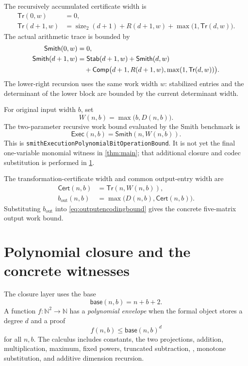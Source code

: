 \documentclass[11pt]{article}
\theoremstyle{definition}
\newcommand{\N}{\mathbb{N}}
\newcommand{\natsize}{\operatorname{size}_2}
\newcommand{\code}[1]{\texttt{\detokenize{#1}}}
\newcommand{\decl}[1]{\nolinkurl{#1}}
\begin{document}
The recursively accumulated certificate width is
\begin{align}
 \mathsf{Tr}(0,w)&=0,\label{eq:transformrec0}\\
 \mathsf{Tr}(d+1,w)&=\natsize(d+1)+R(d+1,w)
       +\max\bigl(1,\mathsf{Tr}(d,w)\bigr).
 \label{eq:transformrec}
\end{align}
The actual arithmetic trace is bounded by
\begin{align}
 \mathsf{Smith}(0,w)&=0,\label{eq:smithrec0}\\
 \mathsf{Smith}(d+1,w)&=
  \mathsf{Stab}(d+1,w)+\mathsf{Smith}(d,w)\notag\\
 &\quad+\mathsf{Comp}\bigl(d+1,R(d+1,w),
                    \max(1,\mathsf{Tr}(d,w))\bigr).
 \label{eq:smithrec}
\end{align}
The lower-right recursion uses the same work width $w$: stabilized entries and the determinant of the lower block are bounded by the current determinant width.

For original input width $b$, set
\begin{equation}
 W(n,b)=\max\bigl(b,D(n,b)\bigr).
 \label{eq:workwidth}
\end{equation}
The two-parameter recursive work bound evaluated by the Smith benchmark is
\begin{equation}
 \mathsf{Exec}(n,b)=\mathsf{Smith}(n,W(n,b)).
 \label{eq:closedexec}
\end{equation}
This is \decl{smithExecutionPolynomialBitOperationBound}.  It is not yet the final one-variable monomial witness in \cref{thm:main}; that additional closure and codec substitution is performed in \cref{sec:poly}.

The transformation-certificate width and common output-entry width are
\begin{align}
 \mathsf{Cert}(n,b)&=\mathsf{Tr}(n,W(n,b)),\label{eq:certbound}\\
 b_{\mathrm{out}}(n,b)&=\max\bigl(D(n,b),\mathsf{Cert}(n,b)\bigr).
 \label{eq:outputentry}
\end{align}
Substituting $b_{\mathrm{out}}$ into \eqref{eq:outputencodingbound} gives the concrete five-matrix output work bound.

\section{Polynomial closure and the concrete witnesses}
\label{sec:poly}

The closure layer uses the base
\[
  \mathsf{base}(n,b)=n+b+2.
\]
A function $f:\N^2\to\N$ has a \emph{polynomial envelope} when the formal object stores a degree $d$ and a proof
\[
  f(n,b)\le\mathsf{base}(n,b)^d
\]
for all $n,b$.  The calculus includes constants, the two projections, addition, multiplication, maximum, fixed powers, truncated subtraction, \code{Nat.size}, monotone substitution, and additive dimension recursion.
\end{document}
